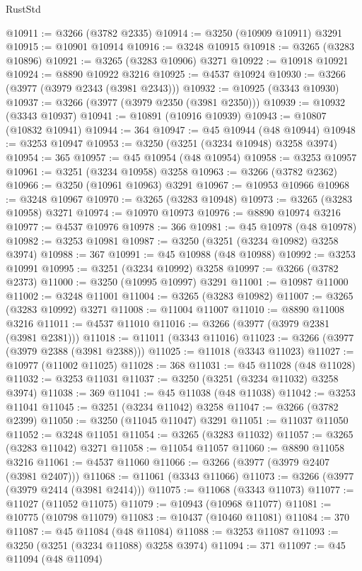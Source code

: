 \begin{lexlean}{RustStd}
\begin{coremodule}
@10911 := @3266 (@3782 @2335)
@10914 := @3250 (@10909 @10911) @3291
@10915 := @10901 @10914
@10916 := @3248 @10915
@10918 := @3265 (@3283 @10896)
@10921 := @3265 (@3283 @10906) @3271
@10922 := @10918 @10921
@10924 := @8890 @10922 @3216
@10925 := @4537 @10924
@10930 := @3266 (@3977 (@3979 @2343 (@3981 @2343)))
@10932 := @10925 (@3343 @10930)
@10937 := @3266 (@3977 (@3979 @2350 (@3981 @2350)))
@10939 := @10932 (@3343 @10937)
@10941 := @10891 (@10916 @10939)
@10943 := @10807 (@10832 @10941)
@10944 := 364
@10947 := @45 @10944 (@48 @10944)
@10948 := @3253 @10947
@10953 := @3250 (@3251 (@3234 @10948) @3258 @3974)
@10954 := 365
@10957 := @45 @10954 (@48 @10954)
@10958 := @3253 @10957
@10961 := @3251 (@3234 @10958) @3258
@10963 := @3266 (@3782 @2362)
@10966 := @3250 (@10961 @10963) @3291
@10967 := @10953 @10966
@10968 := @3248 @10967
@10970 := @3265 (@3283 @10948)
@10973 := @3265 (@3283 @10958) @3271
@10974 := @10970 @10973
@10976 := @8890 @10974 @3216
@10977 := @4537 @10976
@10978 := 366
@10981 := @45 @10978 (@48 @10978)
@10982 := @3253 @10981
@10987 := @3250 (@3251 (@3234 @10982) @3258 @3974)
@10988 := 367
@10991 := @45 @10988 (@48 @10988)
@10992 := @3253 @10991
@10995 := @3251 (@3234 @10992) @3258
@10997 := @3266 (@3782 @2373)
@11000 := @3250 (@10995 @10997) @3291
@11001 := @10987 @11000
@11002 := @3248 @11001
@11004 := @3265 (@3283 @10982)
@11007 := @3265 (@3283 @10992) @3271
@11008 := @11004 @11007
@11010 := @8890 @11008 @3216
@11011 := @4537 @11010
@11016 := @3266 (@3977 (@3979 @2381 (@3981 @2381)))
@11018 := @11011 (@3343 @11016)
@11023 := @3266 (@3977 (@3979 @2388 (@3981 @2388)))
@11025 := @11018 (@3343 @11023)
@11027 := @10977 (@11002 @11025)
@11028 := 368
@11031 := @45 @11028 (@48 @11028)
@11032 := @3253 @11031
@11037 := @3250 (@3251 (@3234 @11032) @3258 @3974)
@11038 := 369
@11041 := @45 @11038 (@48 @11038)
@11042 := @3253 @11041
@11045 := @3251 (@3234 @11042) @3258
@11047 := @3266 (@3782 @2399)
@11050 := @3250 (@11045 @11047) @3291
@11051 := @11037 @11050
@11052 := @3248 @11051
@11054 := @3265 (@3283 @11032)
@11057 := @3265 (@3283 @11042) @3271
@11058 := @11054 @11057
@11060 := @8890 @11058 @3216
@11061 := @4537 @11060
@11066 := @3266 (@3977 (@3979 @2407 (@3981 @2407)))
@11068 := @11061 (@3343 @11066)
@11073 := @3266 (@3977 (@3979 @2414 (@3981 @2414)))
@11075 := @11068 (@3343 @11073)
@11077 := @11027 (@11052 @11075)
@11079 := @10943 (@10968 @11077)
@11081 := @10775 (@10798 @11079)
@11083 := @10437 (@10460 @11081)
@11084 := 370
@11087 := @45 @11084 (@48 @11084)
@11088 := @3253 @11087
@11093 := @3250 (@3251 (@3234 @11088) @3258 @3974)
@11094 := 371
@11097 := @45 @11094 (@48 @11094)

\end{coremodule}
\end{lexlean}
